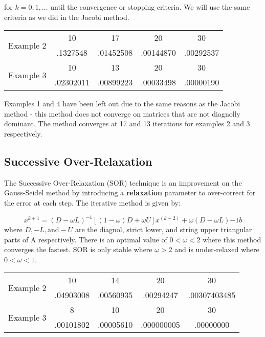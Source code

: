 \documentclass[11pt]{article}	%
\begin{document}
for $k = 0, 1, ...$ until the convergence or stopping criteria. We will use the same criteria as we did in the Jacobi method.

\begin{center}
    \begin{tabular}{||c|c|c|c|c||}
        \hline
        \multirow{2}{5em}{Example 2} & 10 & 17 & 20 & 30 \\ [.25em]
        & .1327548 & .01452508 & .00144870 & .00292537 \\ [.25em]
        \hline \hline
        \multirow{2}{5em}{Example 3} & 10 & 13 & 20 & 30 \\ [.25em]
        & .02302011 & .00899223 & .00033498 & .00000190 \\ [.25em]
        \hline
    \end{tabular}
\end{center}
Examples 1 and 4 have been left out due to the same reasons as the Jacobi method - this method does not converge on matrices that are not diagnolly dominant. The method converges at 17 and 13 iterations for examples 2 and 3 respectively.

\subsection{Successive Over-Relaxation}
The Successive Over-Relaxation (SOR) technique is an improvement on the Gauss-Seidel method by introducing a \textbf{relaxation} parameter to over-correct for the error at each step. The iterative method is given by:

\begin{equation}\label{eq:successive-over-relax-eq-1}
    x^{k+1} = (D - \omega L)^{-1}[(1 - \omega)D + \omega U]x^{(k-2)} + \omega(D - \omega L){-1}b
\end{equation}
where $D, -L, \textrm{and} -U$ are the diagnol, strict lower, and string upper triangular parts of A respectively. There is an optimal value of $0 < \omega < 2$ where this method converges the fastest. SOR is only stable where $\omega > 2$ and is under-relaxed where $0 < \omega < 1$.

\begin{center}
    \begin{tabular}{||c|c|c|c|c||}
        \hline
        \multirow{2}{5em}{Example 2} & 10 & 14 &  20 & 30 \\ [.25em]
        & .04903008 & .00560935 & .00294247 & .00307403485 \\ [.25em]
        \hline\hline
        \multirow{2}{5em}{Example 3} & 8 & 10 & 20 & 30 \\ [.25em]
        & .00101802 & .00005610 & .000000005 & .00000000 \\ [.25em]
        \hline
    \end{tabular}
\end{center}
\end{document}

